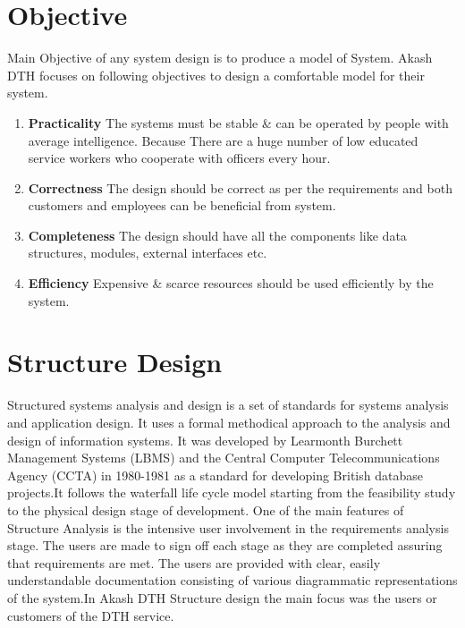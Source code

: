 \begin{spacing}{1}
\section{Objective}
Main Objective of any system design is to produce a model of System.  Akash DTH focuses on following objectives to design a comfortable model for their system.
\begin{enumerate}
	\item \textbf{Practicality} \newline The systems must be stable \& can be operated by people with average intelligence. Because There are a huge number of low educated service workers who cooperate with  officers every hour. 
	\item \textbf{Correctness}  \newline The design should be correct as per the requirements and both customers and employees can be beneficial from  system.
	\item \textbf{Completeness} \newline  The design should have all the components like data structures, modules, external interfaces etc.
	\item \textbf{Efficiency} \newline  Expensive \& scarce resources should be used efficiently by the system.
\end{enumerate}

\section{Structure Design}
Structured systems analysis and design  is a set of standards for systems analysis and application design. It uses a formal methodical approach to the analysis and design of information systems. It was developed by Learmonth Burchett Management Systems (LBMS) and the Central Computer Telecommunications Agency (CCTA) in 1980-1981 as a standard for developing British database projects.It follows the waterfall life cycle model starting from the feasibility study to the physical design stage of development. One of the main features of Structure Analysis is the intensive user involvement in the requirements analysis stage. The users are made to sign off each stage as they are completed assuring that requirements are met. The users are provided with clear, easily understandable documentation consisting of various diagrammatic representations of the system.In Akash DTH Structure design the main focus was the users or customers of the DTH service. 


\end{spacing}
